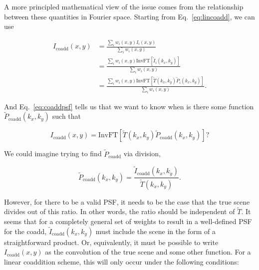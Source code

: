 \documentclass{aastex63}
\begin{document}
 
 A more principled mathematical view of the issue comes from the relationship between these quantities in Fourier space.  Starting from Eq.~\eqref{eq:lincoadd}, we can use
 \begin{linenomath}\begin{align*}
     I_\text{coadd}(x,y) &= \frac{\sum_i w_i(x,y) I_i(x,y)}{\sum_i w_i(x,y)} \\
     &= \frac{\sum_i w_i(x,y) \text{InvFT}[\widetilde{I}_i(k_x,k_y)]}{\sum_i w_i(x,y)}\\
     &= \frac{\sum_i w_i(x,y) \text{InvFT}[\widetilde{T}(k_x,k_y)\widetilde{P}_i(k_x,k_y)]}{\sum_i w_i(x,y)}.
 \end{align*}\end{linenomath}
And Eq.~\eqref{eq:coaddpsf} tells us that we want to know when is there some function $\widetilde{P}_\text{coadd}(k_x,k_y)$ such that
\begin{linenomath}\begin{equation*}
    I_\text{coadd}(x,y) = \text{InvFT}[\widetilde{T}(k_x,k_y)\widetilde{P}_\text{coadd}(k_x,k_y)]?
\end{equation*}\end{linenomath}
We could imagine trying to find $\widetilde{P}_\text{coadd}$ via division,
\begin{linenomath}\begin{equation}\label{eq:fourier_solve}
    \widetilde{P}_\text{coadd}(k_x,k_y) = \frac{\widetilde{I}_\text{coadd}(k_x,k_y)}{\widetilde{T}(k_x,k_y)}.
\end{equation}\end{linenomath}
However, for there to be a valid PSF, it needs to be the case that the true scene divides out of this ratio. In other words, the ratio should be independent of $\widetilde{T}$.  It seems that for a completely general set of weights to result in a well-defined PSF for the coadd, $\widetilde{I}_\text{coadd}(k_x,k_y)$ must include the scene in the form of a straightforward product.  Or, equivalently, it must be possible to write $I_\text{coadd}(x,y)$ as the convolution of the true scene and some other function.   For a linear coaddition scheme, this will only occur under the following conditions:
\end{document}
